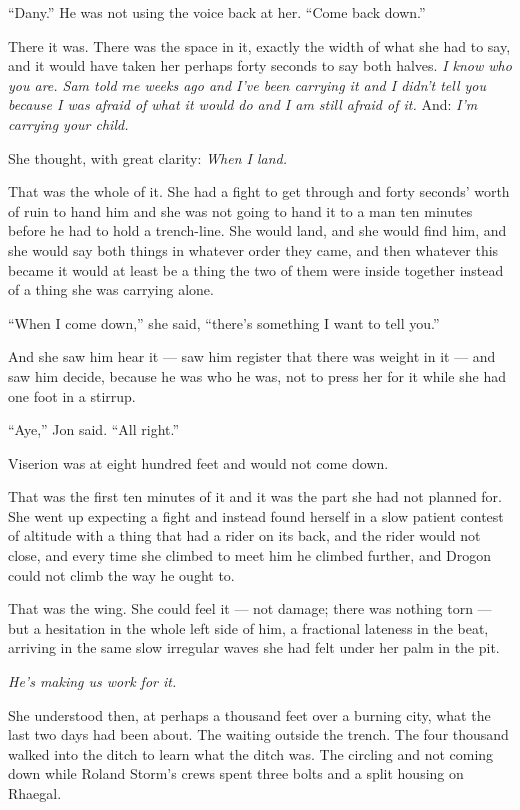 “Dany.” He was not using the voice back at her. “Come back down.”

There it was. There was the space in it, exactly the width of what she had to say, and it would have taken her perhaps forty seconds to say both halves. \textit{I know who you are. Sam told me weeks ago and I’ve been carrying it and I didn’t tell you because I was afraid of what it would do and I am still afraid of it.} And: \textit{I’m carrying your child.}

She thought, with great clarity: \textit{When I land.}

That was the whole of it. She had a fight to get through and forty seconds’ worth of ruin to hand him and she was not going to hand it to a man ten minutes before he had to hold a trench-line. She would land, and she would find him, and she would say both things in whatever order they came, and then whatever this became it would at least be a thing the two of them were inside together instead of a thing she was carrying alone.

“When I come down,” she said, “there’s something I want to tell you.”

And she saw him hear it — saw him register that there was weight in it — and saw him decide, because he was who he was, not to press her for it while she had one foot in a stirrup.

“Aye,” Jon said. “All right.”

\sceneBreak

Viserion was at eight hundred feet and would not come down.

That was the first ten minutes of it and it was the part she had not planned for. She went up expecting a fight and instead found herself in a slow patient contest of altitude with a thing that had a rider on its back, and the rider would not close, and every time she climbed to meet him he climbed further, and Drogon could not climb the way he ought to.

That was the wing. She could feel it — not damage; there was nothing torn — but a hesitation in the whole left side of him, a fractional lateness in the beat, arriving in the same slow irregular waves she had felt under her palm in the pit.

\textit{He’s making us work for it.}

She understood then, at perhaps a thousand feet over a burning city, what the last two days had been about. The waiting outside the trench. The four thousand walked into the ditch to learn what the ditch was. The circling and not coming down while Roland Storm’s crews spent three bolts and a split housing on Rhaegal.

